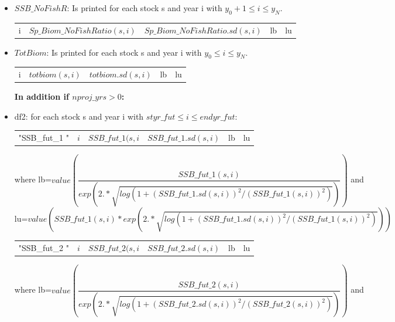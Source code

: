 \documentclass{article}
\begin{document}
\begin{itemize}
\begin{center}
\begin{tabular}{c c c c c}
\end{tabular}
\end{center}

\item $SSB\_NoFishR$: Is printed for each stock s and year i with $y_0 +1\leq i \leq y_N$.
\begin{center}
\begin{tabular}{c c c c c}
  i   &  $Sp\_Biom\_NoFishRatio(s,i)$ & $Sp\_Biom\_NoFishRatio.sd(s,i)$ & lb & lu \\
      
\end{tabular}
\end{center}
\item  $TotBiom$: Is printed for each stock s and year i with $y_0 \leq i \leq y_N$.
\begin{center}
\begin{tabular}{c c c c c}
  i   &  $totbiom(s,i)$ & $totbiom.sd(s,i)$ & lb & lu \\
      
\end{tabular}
\end{center}
\textbf{In addition if $nproj\_yrs>0$:}
\item df2: for each stock s and year i with $styr\_fut\leq  i \leq endyr\_fut$:
\begin{center}
    \begin{tabular}{c c c c c c}
"SSB\_fut\_1 "    & $i$ &  $SSB\_fut\_1(s,i$ & $SSB\_fut\_1.sd(s,i)$ & lb & lu\\ \end{tabular}
\end{center}
where lb=$value\left(\dfrac{SSB\_fut\_1(s,i)}{exp\left(2.*\sqrt{log(1+{(SSB\_fut\_1.sd(s,i))}^2/{(SSB\_fut\_1(s,i))}^2)}\right)}\right)$ and \\

lu=$value\left({SSB\_fut\_1(s,i)}*{exp\left(2.*\sqrt{log(1+{(SSB\_fut\_1.sd(s,i))}^2/{(SSB\_fut\_1(s,i))}^2)}\right)}\right)$ 

\begin{center}
    \begin{tabular}{c c c c c c}
"SSB\_fut\_2 "    & $i$ &  $SSB\_fut\_2(s,i$ & $SSB\_fut\_2.sd(s,i)$ & lb & lu\\ \end{tabular}
\end{center}
where lb=$value\left(\dfrac{SSB\_fut\_2(s,i)}{exp\left(2.*\sqrt{log(1+{(SSB\_fut\_2.sd(s,i))}^2/{(SSB\_fut\_2(s,i))}^2)}\right)}\right)$ and \\


\end{itemize}
\end{document}
